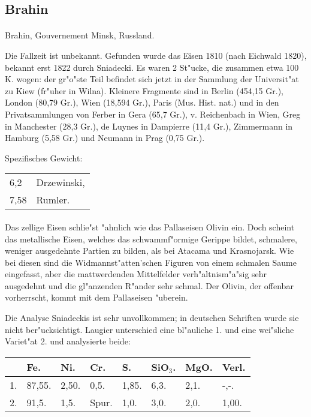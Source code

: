 \documentclass[a4paper, 11pt, oneside]{article}
\begin{document}
\subsection{Brahin}
\normalsize
\paragraph{}
Brahin, Gouvernement Minsk, Russland.

Die Fallzeit ist unbekannt. Gefunden wurde das Eisen 1810 (nach Eichwald 1820), bekannt erst 1822 durch Sniadecki. Es waren 2 St"ucke, die zusammen etwa 100 K. wogen: der gr"o"ste Teil befindet sich jetzt in der Sammlung der Universit"at zu Kiew (fr"uher in Wilna). Kleinere Fragmente sind in Berlin (454,15 Gr.), London (80,79 Gr.), Wien (18,594 Gr.), Paris (Mus. Hist. nat.) und in den Privatsammlungen von Ferber in Gera (65,7 Gr.), v. Reichenbach in Wien, Greg in Manchester (28,3 Gr.), de Luynes in Dampierre (11,4 Gr.), Zimmermann in Hamburg (5,58 Gr.) und Neumann in Prag (0,75 Gr.).

Spezifisches Gewicht:  
\begin{table}[!ht]
    \centering
    \begin{tabular}{l l}
        6,2 & Drzewinski,\\
        7,58 & Rumler.
    \end{tabular}
\end{table}
\paragraph{}
Das zellige Eisen schlie"st "ahnlich wie das Pallaseisen Olivin ein. Doch scheint das metallische Eisen, welches das schwammf"ormige Gerippe bildet, schmalere, weniger ausgedehnte Partien zu bilden, als bei Atacama und Krasnojarsk. Wie bei diesen sind die Widmannst"atten'schen Figuren von einem schmalen Saume eingefasst, aber die mattwerdenden Mittelfelder verh"altnism"a"sig sehr ausgedehnt und die gl"anzenden R"ander sehr schmal. Der Olivin, der offenbar vorherrscht, kommt mit dem Pallaseisen "uberein.

Die Analyse Sniadeckis ist sehr unvollkommen; in deutschen Schriften wurde sie nicht ber"ucksichtigt. Laugier unterschied eine bl"auliche 1. und eine wei"sliche Variet"at 2. und analysierte beide:
\begin{table}[H]
    \centering
    \begin{tabular}{l l l l l l l l}
         & Fe. & Ni. & Cr. & S. & SiO$_{3}$. & MgO. & Verl. \\ \hline
        1. & 87,55. & 2,50. & 0,5. & 1,85. & 6,3. & 2,1. & -,-. \\
        2. & 91,5. & 1,5. & Spur. & 1,0. & 3,0. & 2,0. & 1,00. \\
    \end{tabular}
\end{table}
\end{document}
